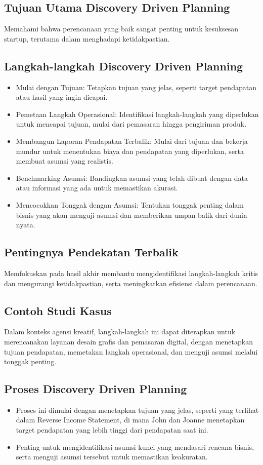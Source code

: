 \documentclass{article}
\begin{document}
\subsection{Tujuan Utama Discovery Driven Planning}
Memahami bahwa perencanaan yang baik sangat penting untuk kesuksesan startup, terutama dalam menghadapi ketidakpastian.

\subsection{Langkah-langkah Discovery Driven Planning}
\begin{itemize}
    \item Mulai dengan Tujuan: Tetapkan tujuan yang jelas, seperti target pendapatan atau hasil yang ingin dicapai.
    \item Pemetaan Langkah Operasional: Identifikasi langkah-langkah yang diperlukan untuk mencapai tujuan, mulai dari pemasaran hingga pengiriman produk.
    \item Membangun Laporan Pendapatan Terbalik: Mulai dari tujuan dan bekerja mundur untuk menentukan biaya dan pendapatan yang diperlukan, serta membuat asumsi yang realistis.
    \item Benchmarking Asumsi: Bandingkan asumsi yang telah dibuat dengan data atau informasi yang ada untuk memastikan akurasi.
    \item Mencocokkan Tonggak dengan Asumsi: Tentukan tonggak penting dalam bisnis yang akan menguji asumsi dan memberikan umpan balik dari dunia nyata.
\end{itemize}

\subsection{Pentingnya Pendekatan Terbalik}
Memfokuskan pada hasil akhir membantu mengidentifikasi langkah-langkah kritis dan mengurangi ketidakpastian, serta meningkatkan efisiensi dalam perencanaan.

\subsection{Contoh Studi Kasus}
Dalam konteks agensi kreatif, langkah-langkah ini dapat diterapkan untuk merencanakan layanan desain grafis dan pemasaran digital, dengan menetapkan tujuan pendapatan, memetakan langkah operasional, dan menguji asumsi melalui tonggak penting.

\subsection{Proses Discovery Driven Planning}
\begin{itemize}
    \item Proses ini dimulai dengan menetapkan tujuan yang jelas, seperti yang terlihat dalam Reverse Income Statement, di mana John dan Joanne menetapkan target pendapatan yang lebih tinggi dari pendapatan saat ini.
    \item Penting untuk mengidentifikasi asumsi kunci yang mendasari rencana bisnis, serta menguji asumsi tersebut untuk memastikan keakuratan.
\end{itemize}
\end{document}
